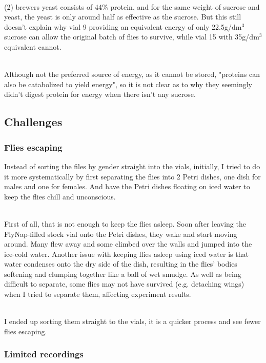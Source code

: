 \documentclass{article}
\begin{document}
\noindent\\
(2) brewers yeast consists of 44\% protein\cite{yeast_comp}, and for the same weight of sucrose and yeast, the yeast is only around half as effective as the sucrose. But this still doesn't explain why vial 9 providing an equivalent energy of only 22.5g/dm$^3$ sucrose can allow the original batch of flies to survive, while vial 15 with 35g/dm$^3$ equivalent cannot.

\noindent\\
Although not the preferred source of energy, as it cannot be stored, "proteins can also be catabolized to yield energy"\cite{protein_digestion}, so it is not clear as to why they seemingly didn't digest protein for energy when there isn't any sucrose.

\subsection{Challenges}

\subsubsection{Flies escaping}

Instead of sorting the files by gender straight into the vials, initially, I tried to do it more systematically by first separating the flies into 2 Petri dishes, one dish for males and one for females. And have the Petri dishes floating on iced water to keep the flies chill and unconscious.

\noindent\\
First of all, that is not enough to keep the flies asleep. Soon after leaving the FlyNap-filled stock vial onto the Petri dishes, they wake and start moving around. Many flew away and some climbed over the walls and jumped into the ice-cold water. Another issue with keeping flies asleep using iced water is that water condenses onto the dry side of the dish, resulting in the flies' bodies softening and clumping together like a ball of wet smudge. As well as being difficult to separate, some flies may not have survived (e.g. detaching wings) when I tried to separate them, affecting experiment results.

\noindent\\
I ended up sorting them straight to the vials, it is a quicker process and see fewer flies escaping.

\subsubsection{Limited recordings}
\end{document}
